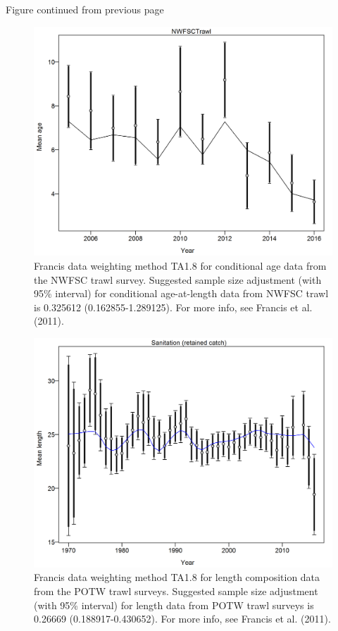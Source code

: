 \documentclass[12pt,]{article}
\begin{document}
\begin{center} 

              Figure continued from previous page 

             \end{center}

\begin{figure}[htbp]
\centering
\includegraphics{r4ss/plots_mod1/comp_condAALfit_data_weighting_TA1.8_condAgeNWFSCTrawl.png}
\caption{Francis data weighting method TA1.8 for conditional age data
from the NWFSC trawl survey. Suggested sample size adjustment (with 95\%
interval) for conditional age-at-length data from NWFSC trawl is
0.325612 (0.162855-1.289125). For more info, see Francis et al. (2011).
\label{fig:comp_condAALfit_data_weighting_TA1.8_condAgeNWFSCTrawl}}
\end{figure}

\begin{figure}[htbp]
\centering
\includegraphics{r4ss/plots_mod1/comp_lenfit_data_weighting_TA1.8_Sanitation.png}
\caption{Francis data weighting method TA1.8 for length composition data
from the POTW trawl surveys. Suggested sample size adjustment (with 95\%
interval) for length data from POTW trawl surveys is 0.26669
(0.188917-0.430652). For more info, see Francis et al. (2011).
\label{fig:comp_lenfit_data_weighting_TA1.8_Sanitation}}
\end{figure}
\end{document}
